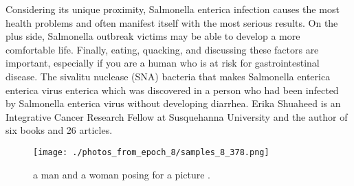 \documentclass{article}%
\begin{document}
Considering its unique proximity, Salmonella enterica infection causes the most health problems and often manifest itself with the most serious results. On the plus side, Salmonella outbreak victims may be able to develop a more comfortable life. Finally, eating, quacking, and discussing these factors are important, especially if you are a human who is at risk for gastrointestinal disease.\newline%
The sivalitu nuclease (SNA) bacteria that makes Salmonella enterica enterica virus enterica which was discovered in a person who had been infected by Salmonella enterica virus without developing diarrhea. Erika Shuaheed is an Integrative Cancer Research Fellow at Susquehanna University and the author of six books and 26 articles.\newline%

%


\begin{figure}[h!]%
\centering%
\texttt{[image: ./photos\_from\_epoch\_8/samples\_8\_378.png]}%
\caption{a man and a woman posing for a picture .}%
\end{figure}

%
\end{document}
